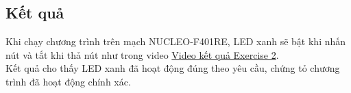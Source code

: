 \documentclass[12pt, letterpaper]{article}
\begin{document}
\subsection{Kết quả}
Khi chạy chương trình trên mạch NUCLEO-F401RE, LED xanh sẽ bật khi nhấn nút và tắt khi thả nút như trong video
\href{https://drive.google.com/file/d/1M3ls7951JZR6aj7JM57I3B5hiynMz2xX/view?usp=sharing}{Video kết quả Exercise 2}.\\
Kết quả cho thấy LED xanh đã hoạt động đúng theo yêu cầu, chứng tỏ chương trình đã hoạt động chính xác.
\end{document}
